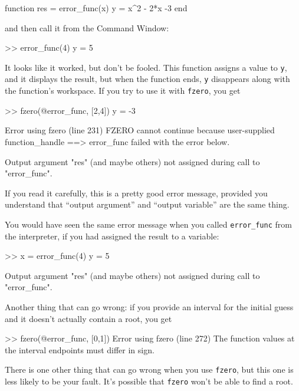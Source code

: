 \begin{code}
function res = error_func(x)
    y = x^2 - 2*x -3
end
\end{code}

and then call it from the Command Window:

\begin{code}
>> error_func(4)
y = 5
\end{code}

It looks like it worked, but don't be fooled.  This function assigns
a value to {\tt y}, and it displays the result, but when the function
ends, {\tt y} disappears along with the function's workspace.
If you try to use it with {\tt fzero}, you get

\begin{code}
>> fzero(@error_func, [2,4])
y = -3

Error using fzero (line 231)
FZERO cannot continue because user-supplied function_handle ==>
error_func failed with the error below.

Output argument "res" (and maybe others) not assigned during call
to "error_func".
\end{code}

If you read it carefully, this is a pretty good error message,
provided you understand that ``output argument'' and ``output variable'' are the same thing.


You would have seen the same error message when you called \verb"error_func" from the interpreter, if you had assigned the result
to a variable:

\begin{code}
>> x = error_func(4)
y = 5

Output argument "res" (and maybe others) not assigned during
call to "error_func".
\end{code}

Another thing that can go wrong: if you provide an interval for the
initial guess and it doesn't actually contain a root, you get

\begin{code}
>> fzero(@error_func, [0,1])
Error using fzero (line 272)
The function values at the interval endpoints must differ in sign.
\end{code}


There is one other thing that can go wrong when you use {\tt fzero}, but
this one is less likely to be your fault.  It's possible that {\tt fzero}
won't be able to find a root.

